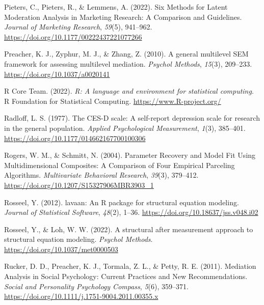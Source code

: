 \documentclass[
  man]{apa6}
\newlength{\cslhangindent}
\newlength{\cslentryspacingunit} %
\newenvironment{CSLReferences}[2] %
 {%
  \setlength{\parindent}{0pt}
  \ifodd #1
  \let\oldpar\par
  \def\par{\hangindent=\cslhangindent\oldpar}
  \fi
  \setlength{\parskip}{#2\cslentryspacingunit}
 }%
 {}
\begin{document}
\begin{CSLReferences}{1}{0}
\leavevmode{}%
Pieters, C., Pieters, R., \& Lemmens, A. (2022). Six {Methods} for {Latent Moderation Analysis} in {Marketing Research}: {A Comparison} and {Guidelines}. \emph{Journal of Marketing Research}, \emph{59}(5), 941--962. \url{https://doi.org/10.1177/00222437221077266}

\leavevmode{}%
Preacher, K. J., Zyphur, M. J., \& Zhang, Z. (2010). A general multilevel {SEM} framework for assessing multilevel mediation. \emph{Psychol Methods}, \emph{15}(3), 209--233. \url{https://doi.org/10.1037/a0020141}

\leavevmode{}%
R Core Team. (2022). \emph{R: A language and environment for statistical computing}. R Foundation for Statistical Computing. \url{https://www.R-project.org/}

\leavevmode{}%
Radloff, L. S. (1977). The {CES-D} scale: {A} self-report depression scale for research in the general population. \emph{Applied Psychological Measurement}, \emph{1}(3), 385--401. \url{https://doi.org/10.1177/014662167700100306}

\leavevmode{}%
Rogers, W. M., \& Schmitt, N. (2004). Parameter {Recovery} and {Model Fit Using Multidimensional Composites}: {A Comparison} of {Four Empirical Parceling Algorithms}. \emph{Multivariate Behavioral Research}, \emph{39}(3), 379--412. \url{https://doi.org/10.1207/S15327906MBR3903_1}

\leavevmode{}%
Rosseel, Y. (2012). {lavaan}: An {R} package for structural equation modeling. \emph{Journal of Statistical Software}, \emph{48}(2), 1--36. \url{https://doi.org/10.18637/jss.v048.i02}

\leavevmode{}%
Rosseel, Y., \& Loh, W. W. (2022). A structural after measurement approach to structural equation modeling. \emph{Psychol Methods}. \url{https://doi.org/10.1037/met0000503}

\leavevmode{}%
Rucker, D. D., Preacher, K. J., Tormala, Z. L., \& Petty, R. E. (2011). Mediation {Analysis} in {Social Psychology}: {Current Practices} and {New Recommendations}. \emph{Social and Personality Psychology Compass}, \emph{5}(6), 359--371. \url{https://doi.org/10.1111/j.1751-9004.2011.00355.x}


\end{CSLReferences}
\end{document}
